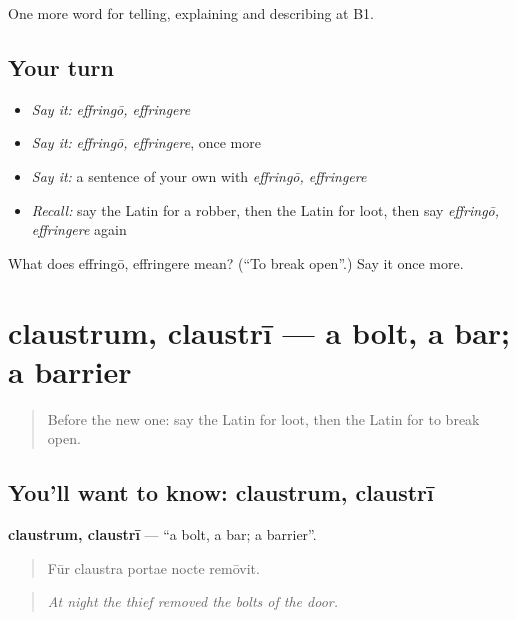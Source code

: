 \begin{grammarlens}[title={What you've built}]
One more word for telling, explaining and describing at B1.
\end{grammarlens}

\subsection*{Your turn}
\begin{itemize}
\raggedright
  \item \emph{Say it:} \emph{effringō, effringere}
  \item \emph{Say it:} \emph{effringō, effringere}, once more
  \item \emph{Say it:} a sentence of your own with \emph{effringō, effringere}
  \item \emph{Recall:} say the Latin for a robber, then the Latin for loot, then say \emph{effringō, effringere} again
\end{itemize}

\begin{tcolorbox}[breakable,colback=teal!4,colframe=teal!35!black,title={Before you move on}]
What does effringō, effringere mean? (\textquotedblleft{}To break open\textquotedblright{}.) Say it once more.
\end{tcolorbox}
\section[claustrum, claustrī]{claustrum, claustrī — a bolt, a bar; a barrier}

\label{lesson:LA-C304-claustrum}



\begin{quote}
Before the new one: say the Latin for loot, then the Latin for to break open.
\end{quote}

\subsection*{You'll want to know: claustrum, claustrī}
\textbf{claustrum, claustrī} — \textquotedblleft{}a bolt, a bar; a barrier\textquotedblright{}.

\begin{quote}
Fūr claustra portae nocte remōvit.
\end{quote}

\begin{quote}
\emph{At night the thief removed the bolts of the door.}
\end{quote}

